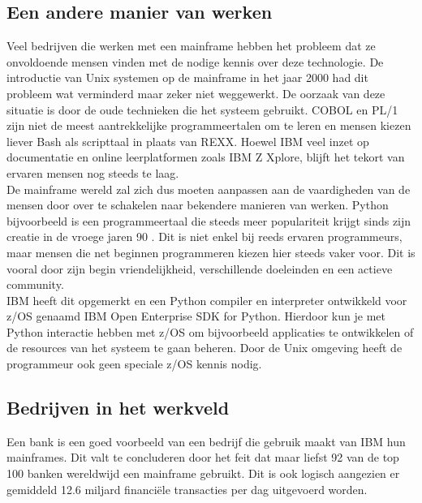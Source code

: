 \subsection{Een andere manier van werken}
Veel bedrijven die werken met een mainframe hebben het probleem dat ze onvoldoende mensen vinden met de nodige kennis over deze technologie. De introductie van Unix systemen op de mainframe in het jaar 2000 \autocite{Mertic2020} had dit probleem wat verminderd maar zeker niet weggewerkt. De oorzaak van deze situatie is door de oude technieken die het systeem gebruikt. COBOL en PL/1 zijn niet de meest aantrekkelijke programmeertalen om te leren en mensen kiezen liever Bash als scripttaal in plaats van REXX. Hoewel IBM veel inzet op documentatie en online leerplatformen zoals IBM Z Xplore, blijft het tekort van ervaren mensen nog steeds te laag. \\

De mainframe wereld zal zich dus moeten aanpassen aan de vaardigheden van de mensen door over te schakelen naar bekendere manieren van werken. 
Python bijvoorbeeld is een programmeertaal die steeds meer populariteit krijgt sinds zijn creatie in de vroege jaren 90 \autocite{Johnson2023}. Dit is niet enkel bij reeds ervaren programmeurs, maar mensen die net beginnen programmeren kiezen hier steeds vaker voor. Dit is vooral door zijn begin vriendelijkheid, verschillende doeleinden en een actieve community. \autocite{Johnson2023} \\

IBM heeft dit opgemerkt en een Python compiler en interpreter ontwikkeld voor z/OS genaamd IBM Open Enterprise SDK for Python. Hierdoor kun je met Python interactie hebben met z/OS om bijvoorbeeld applicaties te ontwikkelen of de resources van het systeem te gaan beheren. Door de Unix omgeving heeft de programmeur ook geen speciale z/OS kennis nodig. \autocite{Klaey2023} \\

\subsection{Bedrijven in het werkveld}
Een bank is een goed voorbeeld van een bedrijf die gebruik maakt van IBM hun mainframes. Dit valt te concluderen door het feit dat maar liefst 92 van de top 100 banken wereldwijd een mainframe gebruikt. Dit is ook logisch aangezien er gemiddeld 12.6 miljard financiële transacties per dag uitgevoerd worden. \autocite{Wagle2017} \\

